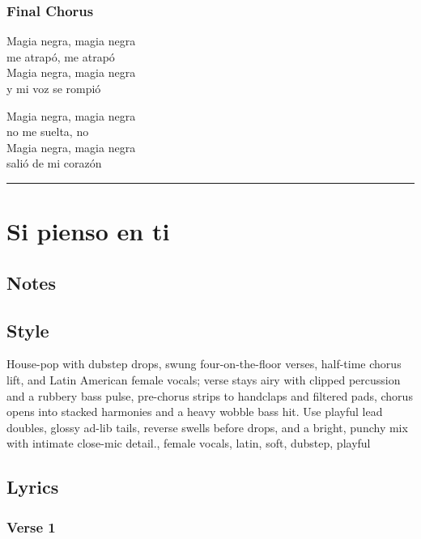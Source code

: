 \documentclass[]{article}
\begin{document}
\subsubsection{Final Chorus}\label{final-chorus-3}

Magia negra, magia negra\\
me atrapó, me atrapó\\
Magia negra, magia negra\\
y mi voz se rompió

Magia negra, magia negra\\
no me suelta, no\\
Magia negra, magia negra\\
salió de mi corazón

\begin{center}\rule{0.5\linewidth}{0.5pt}\end{center}

\section{Si pienso en ti}\label{si-pienso-en-ti}

\subsection{Notes}\label{notes-27}

\subsection{Style}\label{style-27}

House-pop with dubstep drops, swung four-on-the-floor verses, half-time
chorus lift, and Latin American female vocals; verse stays airy with
clipped percussion and a rubbery bass pulse, pre-chorus strips to
handclaps and filtered pads, chorus opens into stacked harmonies and a
heavy wobble bass hit. Use playful lead doubles, glossy ad-lib tails,
reverse swells before drops, and a bright, punchy mix with intimate
close-mic detail., female vocals, latin, soft, dubstep, playful

\subsection{Lyrics}\label{lyrics-27}

\subsubsection{Verse 1}\label{verse-1-18}
\end{document}
